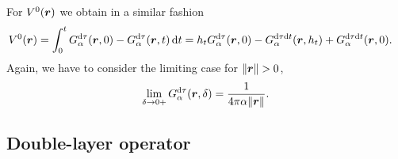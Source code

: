 \documentclass[a4paper,11pt]{article}
\begin{document}
For $V^0({{\bm{r}}})$ we obtain in a similar fashion
\begin{align*}
  V^0({{\bm{r}}}) &= \int_{0}^{t} G^{{\mathrm{d}} \tau}_\alpha({{\bm{r}}},0) - G^{{\mathrm{d}} \tau}_\alpha({{\bm{r}}}, t) \,{\mathrm{d}} t 
  =h_t G^{{\mathrm{d}}\tau}_\alpha({{\bm{r}}},0) - G^{{\mathrm{d}}\tau{\mathrm{d}} t}_\alpha({{\bm{r}}},h_t) + G^{{\mathrm{d}}\tau{\mathrm{d}} t}_\alpha({{\bm{r}}},0).
\end{align*}
Again, we have to consider the limiting case for $\|{{\bm{r}}}\| > 0$,
\begin{equation}
  \label{eq:G_dtau_lim_d}
  \lim_{\delta \to 0+} G^{{\mathrm{d}}\tau}_\alpha({{\bm{r}}},\delta) = \frac{1}{4\pi\alpha\|{{\bm{r}}}\|}.
\end{equation}

\subsection{Double-layer operator}
\end{document}
